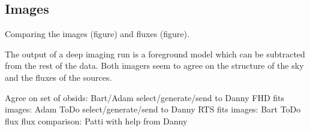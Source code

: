 \subsection{Images}
Comparing the images (figure) and fluxes (figure). 

The output of a deep imaging run is a foreground model which can be subtracted from the rest of the data. Both imagers seem to agree on the structure of the sky and the fluxes of the sources.

Agree on set of obsids: Bart/Adam
select/generate/send to Danny FHD fits images: Adam ToDo  
select/generate/send to Danny RTS fits images: Bart ToDo  
flux flux comparison: Patti with help from Danny


